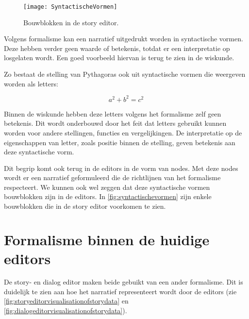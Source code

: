 \begin{wrapfigure}{r}{0.4\textwidth}
    \centering    
    \texttt{[image: SyntactischeVormen]}
    \caption{Bouwblokken in de story editor.}
    \label{fig:syntactischevormen}
\end{wrapfigure}

Volgens formalisme kan een narratief uitgedrukt worden in syntactische vormen. Deze hebben verder geen waarde of betekenis, totdat er een interpretatie op losgelaten wordt. Een goed voorbeeld hiervan is terug te zien in de wiskunde. 

Zo bestaat de stelling van Pythagoras ook uit syntactische vormen die weergeven worden als letters:

\[ a^2 + b^2 = c^2 \]

Binnen de wiskunde hebben deze letters volgens het formalisme zelf geen betekenis. Dit wordt onderbouwd door het feit dat letters gebruikt kunnen worden voor andere stellingen, functies en vergelijkingen. De interpretatie op de eigenschappen van letter, zoals positie binnen de stelling, geven betekenis aan deze syntactische vorm.

Dit begrip komt ook terug in de editors in de vorm van nodes. Met deze nodes wordt er een narratief geformuleerd die de richtlijnen van het formalisme respecteert. We kunnen ook wel zeggen dat deze syntactische vormen bouwblokken zijn in de editors. In \autoref{fig:syntactischevormen} zijn enkele bouwblokken die in de story editor voorkomen te zien.

\section{Formalisme binnen de huidige editors}
De story- en dialog editor maken beide gebuikt van een ander formalisme. Dit is duidelijk te zien aan hoe het narratief representeert wordt door de editors (zie \autoref{fig:storyeditorvisualisationofstorydata} en \autoref{fig:dialogeditorvisualisationofstorydata}). 


